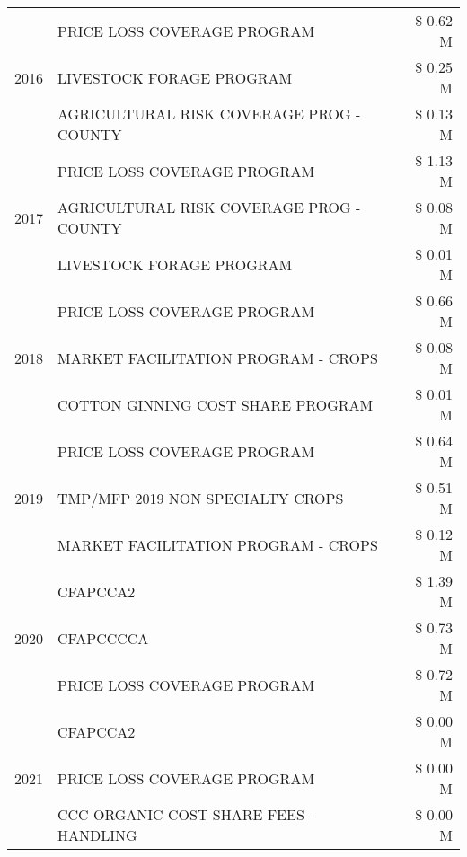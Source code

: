 \begin{tabular}{llr}
\cline{1-3}
\multirow[t]{3}{*}{2016} & PRICE LOSS COVERAGE PROGRAM & \$ 0.62 M \\
 & LIVESTOCK FORAGE PROGRAM & \$ 0.25 M \\
 & AGRICULTURAL RISK COVERAGE PROG - COUNTY & \$ 0.13 M \\
\cline{1-3}
\multirow[t]{3}{*}{2017} & PRICE LOSS COVERAGE PROGRAM & \$ 1.13 M \\
 & AGRICULTURAL RISK COVERAGE PROG - COUNTY & \$ 0.08 M \\
 & LIVESTOCK FORAGE PROGRAM & \$ 0.01 M \\
\cline{1-3}
\multirow[t]{3}{*}{2018} & PRICE LOSS COVERAGE PROGRAM & \$ 0.66 M \\
 & MARKET FACILITATION PROGRAM - CROPS & \$ 0.08 M \\
 & COTTON GINNING COST SHARE PROGRAM & \$ 0.01 M \\
\cline{1-3}
\multirow[t]{3}{*}{2019} & PRICE LOSS COVERAGE PROGRAM & \$ 0.64 M \\
 & TMP/MFP 2019 NON SPECIALTY CROPS & \$ 0.51 M \\
 & MARKET FACILITATION PROGRAM - CROPS & \$ 0.12 M \\
\cline{1-3}
\multirow[t]{3}{*}{2020} & CFAPCCA2 & \$ 1.39 M \\
 & CFAPCCCCA & \$ 0.73 M \\
 & PRICE LOSS COVERAGE PROGRAM & \$ 0.72 M \\
\cline{1-3}
\multirow[t]{3}{*}{2021} & CFAPCCA2 & \$ 0.00 M \\
 & PRICE LOSS COVERAGE PROGRAM & \$ 0.00 M \\
 & CCC ORGANIC COST SHARE FEES - HANDLING & \$ 0.00 M \\
\cline{1-3}
\bottomrule
\end{tabular}
